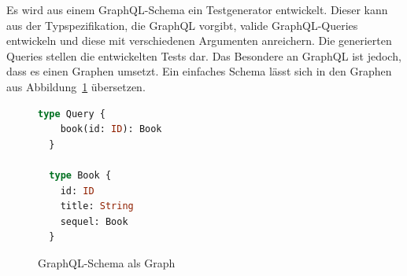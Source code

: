 Es wird aus einem GraphQL-Schema ein Testgenerator entwickelt.
Dieser kann aus der Typspezifikation, die GraphQL vorgibt, valide GraphQL-Queries entwickeln und diese mit verschiedenen Argumenten anreichern.
Die generierten Queries stellen die entwickelten Tests dar.
Das Besondere an GraphQL ist jedoch, dass es einen Graphen umsetzt.
Ein einfaches Schema lässt sich in den Graphen aus Abbildung~\ref{schemgg} übersetzen.

\begin{figure}[h!]
    \centering
    \begin{minipage}{0.45\textwidth}
        \begin{lstlisting}[language=GraphQL]
  type Query {
    book(id: ID): Book
  }

  type Book {
    id: ID
    title: String
    sequel: Book
  }
        \end{lstlisting}
    \end{minipage}
    \hfill %
    \begin{minipage}{0.45\textwidth}
    \end{minipage}
    \caption{GraphQL-Schema als Graph}
    \label{schemgg}
\end{figure}

